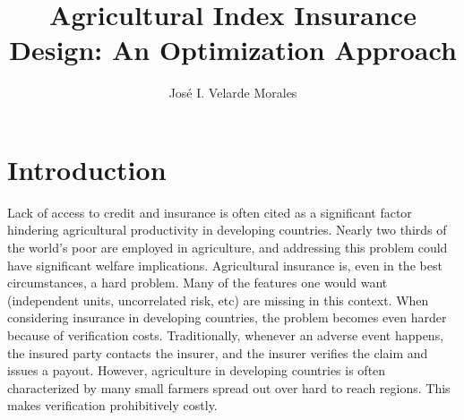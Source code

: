\documentclass[11pt]{article}
\title{Agricultural Index Insurance Design: An Optimization Approach}
\author{José I. Velarde Morales}
\begin{document}
\maketitle

\section{Introduction}
Lack of access to credit and insurance is often cited as a significant factor hindering agricultural productivity in developing countries. Nearly two thirds of the world's poor are employed in agriculture, and addressing this problem could have significant welfare implications. Agricultural insurance is, even in the best circumstances, a hard problem. Many of the features one would want (independent units, uncorrelated risk, etc) are missing in this context. When considering insurance in developing countries, the problem becomes even harder because of verification costs. Traditionally, whenever an adverse event happens, the insured party contacts the insurer, and the insurer verifies the claim and issues a payout. However, agriculture in developing countries is often characterized by many small farmers spread out over hard to reach regions. This makes verification prohibitively costly. 
\end{document}
